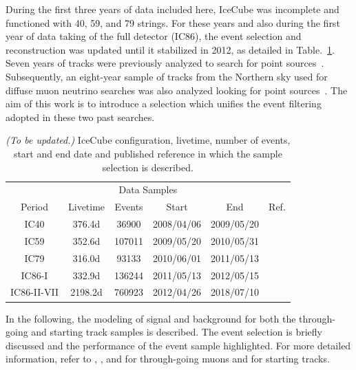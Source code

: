 \documentclass[aps,10pt,prd,twocolumn,floats,letterpaper,showpacs,nofootinbib,bibnotes,notitlepage,superscriptaddress,floatfix]{revtex4-1}
\newcommand{\MA}[1]{{\color{magenta}#1}}
\begin{document}
During the first three years of data included here, IceCube was incomplete and functioned with 40, 59, and 79 strings. For these years and also during the first year of data taking of the full detector (IC86), the event selection and reconstruction was updated until it stabilized in 2012, as detailed in Table.~\ref{tab:livetimes}. Seven years of tracks were previously analyzed to search for point sources~\cite{Aartsen:2016oji}. Subsequently, an eight-year sample of tracks from the Northern sky used for diffuse muon neutrino searches was also analyzed looking for point sources~\cite{Aartsen:2018ywr}. The aim of this work is to introduce a selection which unifies the event filtering adopted in these two past searches.

\begin{table}[t]
\centering
\begin{ruledtabular}
\begin{tabular}{cccccc}
\multicolumn{6}{c}{Data Samples} \\[0.1cm]
Period & Livetime& Events & Start & End & Ref.\\ 
IC40 & 376.4{\rm d} & 36900 & 2008/04/06 & 2009/05/20 & \cite{Abbasi:2010rd} \\
IC59 & 352.6{\rm d} & 107011 & 2009/05/20 & 2010/05/31 & \cite{Aartsen:2013uuv} \\
IC79 & 316.0{\rm d} & 93133 & 2010/06/01 & 2011/05/13 & \cite{Schatto:2014kbj}  \\
IC86-I & 332.9{\rm d} & 136244 & 2011/05/13 & 2012/05/15 & \cite{Aartsen:2014cva} \\
IC86-II-VII & 2198.2{\rm d} & 760923 & 2012/04/26 & 2018/07/10 & \cite{Aartsen:2019fau}\\
\end{tabular}
\end{ruledtabular}
\caption[]{\MA{\it (To be updated.)} IceCube configuration, livetime, number of events, start and end date and published reference in which the sample selection is described.}\label{tab:livetimes}
\end{table}

In the following, the modeling of signal and background for both the
through-going and starting track samples is described.  The event selection is
briefly discussed and the performance of the event sample highlighted. For more
detailed information, refer to \cite{Abbasi:2010rd}, \cite{Aartsen:2013uuv},
and \cite{Aartsen:2014cva} for through-going muons and \cite{Aartsen:2016tpb}
for starting tracks.
\end{document}

